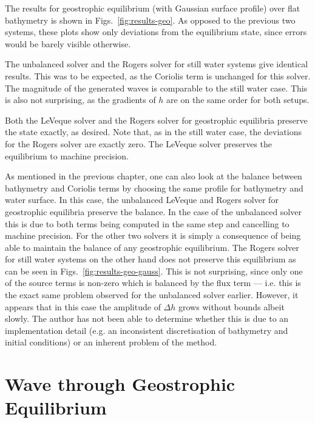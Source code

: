 The results for geostrophic equilibrium (with Gaussian surface profile) over flat bathymetry is shown in Figs.~\ref{fig:results-geo}. As opposed to the previous two systems, these plots show only deviations from the equilibrium state, since errors would be barely visible otherwise.

The unbalanced solver and the Rogers solver for still water systems give identical results. This was to be expected, as the Coriolis term is unchanged for this solver. The magnitude of the generated waves is comparable to the still water case. This is also not surprising, as the gradients of $h$ are on the same order for both setups.

Both the LeVeque solver and the Rogers solver for geostrophic equilibria preserve the state exactly, as desired. Note that, as in the still water case, the deviations for the Rogers solver are exactly zero. The LeVeque solver preserves the equilibrium to machine precision.

As mentioned in the previous chapter, one can also look at the balance between bathymetry and Coriolis terms by choosing the same profile for bathymetry and water surface. In this case, the unbalanced LeVeque and Rogers solver for geostrophic equilibria preserve the balance. In the case of the unbalanced solver this is due to both terms being computed in the same step and cancelling to machine precision. For the other two solvers it is simply a consequence of being able to maintain the balance of any geostrophic equilibrium. The Rogers solver for still water systems on the other hand does not preserve this equilibrium as can be seen in Figs.~\ref{fig:results-geo-gauss}. This is not surprising, since only one of the source terms is non-zero which is balanced by the flux term --- i.e. this is the exact same problem observed for the unbalanced solver earlier. However, it appears that in this case the amplitude of $\Delta h$ grows without bounds albeit slowly. The author has not been able to determine whether this is due to an implementation detail (e.g. an inconsistent discretisation of bathymetry and initial conditions) or an inherent problem of the method.

\section{Wave through Geostrophic Equilibrium}

